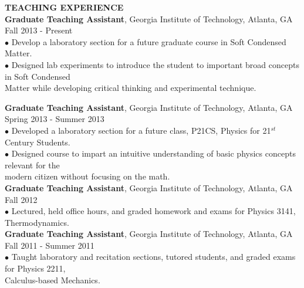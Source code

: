 \documentclass[10pt]{article}
\begin{document}


\textbf{\large TEACHING EXPERIENCE} \\
{\bf Graduate Teaching Assistant}, Georgia Institute of Technology, Atlanta, GA \hfill Fall 2013 - Present\\
\hspace*{10pt}$\bullet$ Develop a laboratory section for a future graduate course in Soft Condensed Matter.  \\
\hspace*{10pt}$\bullet$ Designed lab experiments to introduce the student to important broad concepts in Soft Condensed \\ \hspace*{15pt} Matter while developing critical thinking and experimental technique.  \\

\newpage

{\bf Graduate Teaching Assistant}, Georgia Institute of Technology, Atlanta, GA \hfill Spring 2013 - Summer 2013\\
\hspace*{10pt}$\bullet$ Developed a laboratory section for a future class, P21CS, Physics for 21$^{st}$ Century Students. \\
\hspace*{10pt}$\bullet$ Designed course to impart an intuitive understanding of basic physics concepts relevant for the \\ \hspace*{15pt} modern citizen without focusing on the math. \\

{\bf Graduate Teaching Assistant}, Georgia Institute of Technology, Atlanta, GA \hfill Fall 2012 \\
\hspace*{10pt}$\bullet$ Lectured, held office hours, and graded homework and exams for Physics 3141, Thermodynamics. \\


{\bf Graduate Teaching Assistant}, Georgia Institute of Technology, Atlanta, GA \hfill Fall 2011 - Summer 2011\\
\hspace*{10pt}$\bullet$ Taught laboratory and recitation sections, tutored students, and graded exams for Physics 2211, \\ \hspace*{15pt} Calculus-based Mechanics. \\
\end{document}
